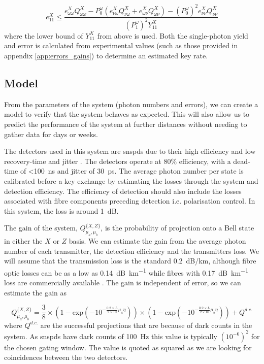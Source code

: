 \begin{equation}
	e^X_{11} \le \frac{e^X_{\omega\omega}Q^X_{\omega\omega} - P^\omega_0\left(e^X_{\nu\omega}Q^X_{\nu\omega} + e^X_{\omega\nu}Q^X_{\omega\nu}\right) - (P^\omega_0)^2e^X_{\nu\nu}Q^X_{\nu\nu}}{(P^\omega_1)^2 Y^X_{11}}
\end{equation}
where the lower bound of $Y^X_{11}$ from above is used. Both the single-photon yield and error is calculated from experimental values (such as those provided in appendix \ref{app:errors_gains}) to determine an estimated key rate.



\subsection{Model}

From the parameters of the system (photon numbers and errors), we can create a model to verify that the system behaves as expected. This will also allow us to predict the performance of the system at further distances without needing to gather data for days or weeks. 

The detectors used in this system are \acp{snspd} due to their high efficiency and low recovery-time and jitter \cite{sprengers2011}. The detectors operate at $80\%$ efficiency, with a dead-time of \SI{<100}{ns} and jitter of \SI{30}{ps}. The average photon number per state is calibrated before a key exchange by estimating the losses through the system and detection efficiency. The efficiency of detection should also include the losses associated with fibre components preceding detection i.e. polarisation control. In this system, the loss is around \SI{1}{dB}.

The gain of the system, $Q^{ \{X,Z\} }_{\mu_a,\mu_b}$, is the probability of projection onto a Bell state in either the $X$ or $Z$ basis. We can estimate the gain from the average photon number of each transmitter, the detection efficiency and the transmitters loss. We will assume that the transmission loss is the standard \SI{0.2}{dB/km}, although fibre optic losses can be as a low as \SI{0.14}{dB\per\km} \cite{tamura2018} while fibres with \SI{0.17}{dB\per\km} loss are commercially available \cite{corningULL}. The gain is independent of error, so we can estimate the gain as 

\begin{equation}
	Q^{ \{X,Z\} }_{\mu_a,\mu_b} = \frac{3}{8} \times \left( 1 - \text{exp} \left( -10^{- \frac{0.2 \times L}{2 \times 10} \mu_a \eta}  \right)  \right) \times \left( 1 - \text{exp} \left( -10^{- \frac{0.2 \times L}{2 \times 10} \mu_b \eta}  \right)  \right) + Q^{d.c.}
\end{equation}
where $Q^{d.c.}$ are the successful projections that are because of dark counts in the system. As \acp{snspd} have dark counts of \SI{100}{Hz} this value is typically $\left(10^{-6}\right)^2$ for the chosen gating window. The value is quoted as squared as we are looking for coincidences between the two detectors. 

